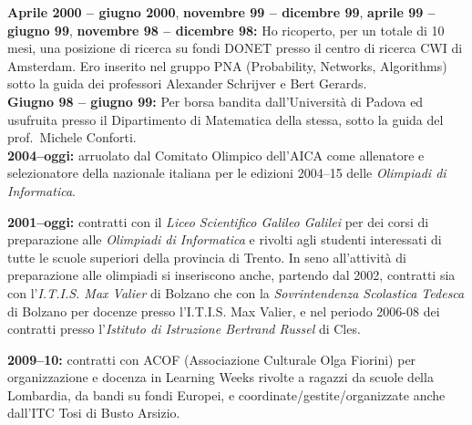 \noindent
{\bf Aprile 2000 -- giugno 2000},
{\bf novembre 99 -- dicembre 99},
{\bf aprile 99 -- giugno 99},
{\bf novembre 98 -- dicembre 98:}
      Ho ricoperto, per un totale di 10 mesi,
      una posizione di ricerca su fondi DONET
      presso il centro di ricerca CWI di Amsterdam.
      Ero inserito nel gruppo PNA (Probability, Networks, Algorithms)
      sotto la guida dei professori Alexander Schrijver
      e Bert Gerards.\\

{\bf Giugno 98 -- giugno 99:}
Per borsa
bandita dall'Universit\`a di Padova
ed usufruita
presso il Dipartimento di Matematica 
della stessa,
sotto la guida del prof.~Michele Conforti.\\


{\bf 2004--oggi:} arruolato dal Comitato Olimpico dell'AICA
come allenatore e selezionatore
della nazionale italiana per le edizioni 2004--15
delle {\em Olimpiadi di Informatica}.

\noindent
{\bf 2001--oggi:}
contratti con il {\em Liceo Scientifico Galileo Galilei}
per dei corsi di preparazione alle {\em Olimpiadi di Informatica}
e rivolti agli studenti interessati
di tutte le scuole superiori della provincia di Trento.
In seno all'attivit\`a di preparazione alle olimpiadi
si inseriscono anche,
partendo dal 2002, contratti
sia con l'{\em I.T.I.S.
Max Valier} di Bolzano che
con la {\em Sovrintendenza Scolastica Tedesca} di Bolzano
per docenze presso l'I.T.I.S.
Max Valier,
e nel periodo 2006-08 dei contratti presso
l'{\em Istituto di Istruzione Bertrand Russel} di Cles.
%

\noindent
{\bf 2009--10:}
contratti con ACOF (Associazione Culturale Olga Fiorini)
per organizzazione e docenza
in Learning Weeks rivolte a ragazzi da scuole della Lombardia,
da bandi su fondi Europei,
e coordinate/gestite/organizzate anche dall'ITC Tosi di Busto Arsizio.


